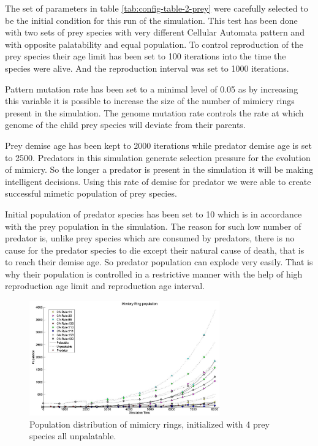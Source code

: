 \documentclass[letterpaper]{article}
\numberwithin{equation}{section}
\begin{document}
The set of parameters in table \ref{tab:config-table-2-prey} were carefully selected to be the initial condition for this run of the simulation. This test has been done with two sets of prey species with very different Cellular Automata pattern and with opposite palatability and equal population. To control reproduction of the prey species their age limit has been set to 100 iterations into the time the species were alive. And the reproduction interval was set to 1000 iterations.

Pattern mutation rate has been set to a minimal level of 0.05 as by increasing this variable it is possible to increase the size of the number of mimicry rings present in the simulation. The genome mutation rate controls the rate at which genome of the child prey species will deviate from their parents.

Prey demise age has been kept to 2000 iterations while predator demise age is set to 2500. Predators in this simulation generate selection pressure for the evolution of mimicry. So the longer a predator is present in the simulation it will be making intelligent decisions. Using this rate of demise for predator we were able to create successful mimetic population of prey species.

Initial population of predator species has been set to 10 which is in accordance with the prey population in the simulation. The reason for such low number of predator is, unlike prey species which are consumed by predators, there is no cause for the predator species to die except their natural cause of death, that is to reach their demise age. So predator population can explode very easily. That is why their population is controlled in a restrictive manner with the help of high reproduction age limit and reproduction age interval.


\begin{figure}[t!]
	\centering
	\includegraphics[width=0.73\textwidth]{images/simTime8k-4Prey-unp}
	\caption[Population distribution of mimicry rings(4 prey species all unpalatable)]{Population distribution of mimicry rings, initialized with 4 prey species all unpalatable.}
	\label{fig:plot-4-prey-unp}
\end{figure}
\end{document}

